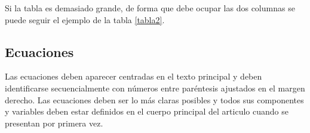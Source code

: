 \documentclass[a4paper,10pt,twoside]{article}
\begin{document}
Si la tabla es demasiado grande, de forma que debe ocupar las dos columnas se puede seguir el ejemplo de la tabla \ref{tabla2}. 

 \begin{table}
	\caption{Comportamiento de los indicadores según escenarios de análisis. \citep{Rubiano2015}}\label{tabla2}
	\centering
    \end{table} 
  
  \subsection{Ecuaciones}

  Las ecuaciones deben aparecer centradas en el texto principal y deben identificarse secuencialmente con números entre paréntesis ajustados en el margen derecho. Las ecuaciones deben ser lo más claras posibles y todos sus componentes y variables deben estar definidos en el cuerpo principal del articulo cuando se presentan por primera vez.
\end{document}
